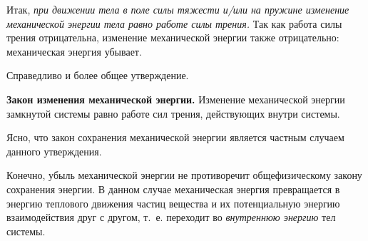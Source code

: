 Итак, \textit{при движении тела в поле силы тяже\-сти и/или на пружине изменение механи\-ческой энер\-гии тела равно работе силы трения.} Так как работа силы трения отрицательна, изменение механи\-ческой энер\-гии также отрицательно: механиче\-ская энергия убывает.

Справедливо и более общее утверждение.

\vspace{5.165pt}\noindent
\textbf{Закон изменения механи\-ческой энер\-гии.} Изменение механи\-ческой энер\-гии замкну\-той си\-стемы равно работе сил трения, действующих внутри си\-стемы.

\vspace{5.165pt}
Ясно, что закон сохране\-ния механи\-ческой энер\-гии является частным случаем данного утвер\-ждения.

Конечно, убыль механи\-ческой энер\-гии не противоречит общефизическому закону сохране\-ния энер\-гии. В данном случае механиче\-ская энергия превращается в энергию теплового движе\-ния частиц вещества и их по\-тенциальную энергию взаимодействия друг с другом, т.~е. переходит во \textit{внутреннюю энергию} тел си\-стемы.
